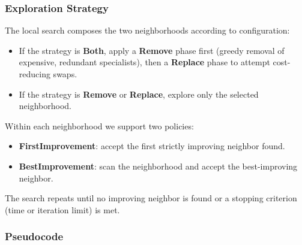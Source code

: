 \documentclass{article}
\begin{document}
\subsubsection{Exploration Strategy}

The local search composes the two neighborhoods according to configuration:

\begin{itemize}
    \item If the strategy is \textbf{Both}, apply a \textbf{Remove} phase first (greedy removal of expensive, redundant specialists), then a \textbf{Replace} phase to attempt cost-reducing swaps.
    \item If the strategy is \textbf{Remove} or \textbf{Replace}, explore only the selected neighborhood.
\end{itemize}

Within each neighborhood we support two policies:

\begin{itemize}
    \item \textbf{FirstImprovement}: accept the first strictly improving neighbor found.
    \item \textbf{BestImprovement}: scan the neighborhood and accept the best-improving neighbor.
\end{itemize}

The search repeats until no improving neighbor is found or a stopping criterion (time or iteration limit) is met.

\subsubsection{Pseudocode}
\end{document}
